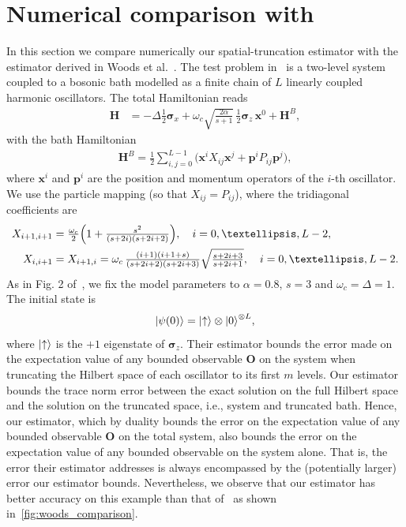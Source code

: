 \documentclass[a4paper,onecolumn,amsmath,amssymb,amsfonts,accepted=2026-03-06]{quantumarticle}
\begin{document}
\section{Numerical comparison with \cite{PRL_estimator}}
\label{sec:PRL_comp}
In this section we compare numerically our spatial-truncation estimator with the estimator derived in Woods et al.~\cite{PRL_estimator}. The test problem in~\cite{PRL_estimator} is a two-level system coupled to a bosonic bath modelled as a finite chain of $L$ linearly coupled harmonic oscillators. The total Hamiltonian reads
\begin{align*}
    \mathbf{H} &= -\Delta \tfrac{1}{2}\boldsymbol{\sigma}_x + \omega_c \sqrt{\tfrac{2\alpha}{s+1}}\,\tfrac{1}{2}\boldsymbol{\sigma}_z\,\mathbf{x}^0 + \mathbf{H}^B,
\end{align*}
with the bath Hamiltonian
\begin{align*}
    \mathbf{H}^B = \tfrac{1}{2}\sum_{i,j=0}^{L-1} \bigl(\mathbf{x}^i X_{ij} \mathbf{x}^j + \mathbf{p}^i P_{ij} \mathbf{p}^j\bigr),
\end{align*}
where $\mathbf{x}^i$ and $\mathbf{p}^i$ are the position and momentum operators of the $i$-th oscillator. We use the particle mapping (so that $X_{ij}=P_{ij}$), where the tridiagonal coefficients are
\begin{align*}
X_{i+1,i+1} &= \tfrac{\omega_c}{2}\Bigl(1 + \tfrac{s^2}{(s+2i)(s+2i+2)}\Bigr), \quad i=0,\dots,L-2, \\
X_{i,i+1} &= X_{i+1,i}= \omega_c\,\tfrac{(i+1)(i+1+s)}{(s+2i+2)(s+2i+3)}\sqrt{\tfrac{s+2i+3}{s+2i+1}},\quad i=0,\dots,L-2.
\end{align*}
As in Fig. 2 of~\cite{PRL_estimator}, we fix the model parameters to $\alpha=0.8$, $s=3$ and $\omega_c=\Delta=1$. The initial state is
\begin{equation*}
    \ket{\psi(0)} = \ket{\uparrow} \otimes {\ket{0}}^{\otimes L},
\end{equation*}
where $\ket{\uparrow}$ is the $+1$ eigenstate of $\boldsymbol{\sigma}_z$.
Their estimator bounds the error made on the expectation value of any bounded observable $\mathbf{O}$ on the system when truncating the Hilbert space of each oscillator to its first $m$ levels. Our estimator bounds the trace norm error between the exact solution on the full Hilbert space and the solution on the truncated space, i.e., system and truncated bath. Hence, our estimator, which by duality bounds the error on the expectation value of any bounded observable $\mathbf{O}$ on the total system, also bounds the error on the expectation value of any bounded observable on the system alone. That is, the error their estimator addresses is always encompassed by the (potentially larger) error our estimator bounds. Nevertheless, we observe that our estimator has better accuracy on this example than that of~\cite{PRL_estimator} as shown in~\cref{fig:woods_comparison}.
\end{document}
